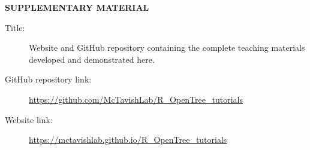 \documentclass[12pt]{article}
\begin{document}
\bigskip
\begin{center}
{\large\bf SUPPLEMENTARY MATERIAL}
\end{center}

\begin{description}

\item[Title:] Website and GitHub repository containing the complete teaching materials developed and demonstrated here.

\item[GitHub repository link:] \url{https://github.com/McTavishLab/R_OpenTree_tutorials}

\item[Website link:] \url{https://mctavishlab.github.io/R_OpenTree_tutorials}

\end{description}


\end{document}
